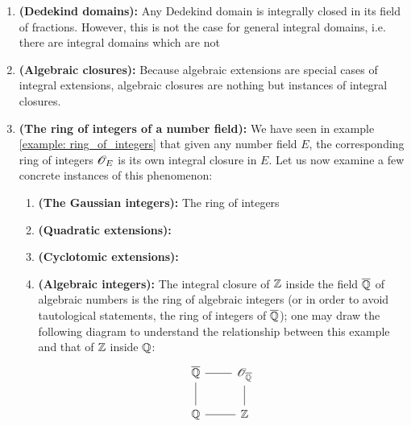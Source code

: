             \begin{example}
                \noindent
                \begin{enumerate}
                    \item \textbf{(Dedekind domains):} Any Dedekind domain is integrally closed in its field of fractions. However, this is not the case for general integral domains, i.e. there are integral domains which are not 
                    \item \textbf{(Algebraic closures):} Because algebraic extensions are special cases of integral extensions, algebraic closures are nothing but instances of integral closures.
                    \item \textbf{(The ring of integers of a number field):} We have seen in example \ref{example: ring_of_integers} that given any number field $E$, the corresponding ring of integers $\mathscr{O}_E$ is its own integral closure in $E$. Let us now examine a few concrete instances of this phenomenon:
                        \begin{enumerate}
                            \item \textbf{(The Gaussian integers):} The ring of integers 
                            \item \textbf{(Quadratic extensions):}
                            \item \textbf{(Cyclotomic extensions):}
                            \item \textbf{(Algebraic integers):} The integral closure of $\mathbb{Z}$ inside the field $\overline{\mathbb{Q}}$ of algebraic numbers is the ring of algebraic integers (or in order to avoid tautological statements, the ring of integers of $\overline{\mathbb{Q}}$); one may draw the following diagram to understand the relationship between this example and that of $\mathbb{Z}$ inside $\mathbb{Q}$:
                                $$
                                    \begin{tikzcd}
                                    	\overline{\Q} & {\scrO_{\overline{\Q}}} \\
                                    	\Q & \Z
                                    	\arrow[no head, from=2-1, to=1-1]
                                    	\arrow[no head, from=2-2, to=1-2]
                                    	\arrow[no head, from=1-1, to=1-2]
                                    	\arrow[no head, from=2-1, to=2-2]
                                    \end{tikzcd}
                                $$
                        \end{enumerate}
                \end{enumerate}
            \end{example}

